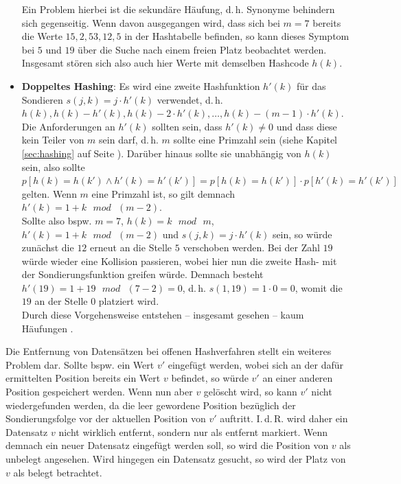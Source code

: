 \begin{itemize}
	Ein Problem hierbei ist die sekundäre Häufung, d.\,h. Synonyme behindern sich gegenseitig. Wenn davon ausgegangen wird, dass sich bei $m=7$ bereits die Werte $15, 2, 53, 12, 5$ in der Hashtabelle befinden, so kann dieses Symptom bei $5$ und $19$ über die Suche nach einem freien Platz beobachtet werden. Insgesamt stören sich also auch hier Werte mit demselben Hashcode $h(k)$.
	\item \textbf{Doppeltes Hashing}: Es wird eine zweite Hashfunktion $h'(k)$ für das Sondieren $s(j,k) = j \cdot h'(k)$ verwendet, d.\,h. $h(k), h(k)-h'(k), h(k)-2 \cdot h'(k), \dots, h(k)-(m-1)\cdot h'(k)$. Die Anforderungen an $h'(k)$ sollten sein, dass $h'(k) \neq 0$ und dass diese kein Teiler von $m$ sein darf, d.\,h. $m$ sollte eine Primzahl sein (siehe Kapitel \ref{sec:hashing} auf Seite \pageref{sec:hashing}). Darüber hinaus sollte sie unabhängig von $h(k)$ sein, also sollte $p[h(k) = h(k') \wedge h'(k) = h'(k')] = p[h(k) = h(k')] \cdot p[h'(k) = h'(k')]$ gelten. Wenn $m$ eine Primzahl ist, so gilt demnach $h'(k) = 1+k \text{ } mod \text{ } (m-2)$.\\
	Sollte also bspw. $m=7$, $h(k) = k \text{ } mod \text{ } m$, $h'(k) = 1 + k \text{ } mod \text{ } (m-2)$ und $s(j,k) = j \cdot h'(k)$ sein, so würde zunächst die $12$ erneut an die Stelle $5$ verschoben werden. Bei der Zahl $19$ würde wieder eine Kollision passieren, wobei hier nun die zweite Hash- mit der Sondierungsfunktion greifen würde. Demnach besteht $h'(19) = 1 + 19 \text{ } mod \text{ } (7-2) = 0$, d.\,h. $s(1,19) = 1 \cdot 0 = 0$, womit die $19$ an der Stelle $0$ platziert wird.\\
	Durch diese Vorgehensweise entstehen -- insgesamt gesehen -- kaum Häufungen \cite[S.282-285]{s1992}. 
\end{itemize}
Die Entfernung von Datensätzen bei offenen Hashverfahren stellt ein weiteres Problem dar. Sollte bspw. ein Wert $v'$ eingefügt werden, wobei sich an der dafür ermittelten Position bereits ein Wert $v$ befindet, so würde $v'$ an einer anderen Position gespeichert werden. Wenn nun aber $v$ gelöscht wird, so kann $v'$ nicht wiedergefunden werden, da die leer gewordene Position bezüglich der Sondierungsfolge vor der aktuellen Position von $v'$ auftritt. I.\,d.\,R. wird daher ein Datensatz $v$ nicht wirklich entfernt, sondern nur als entfernt markiert. Wenn demnach ein neuer Datensatz eingefügt werden soll, so wird die Position von $v$ als unbelegt angesehen. Wird hingegen ein Datensatz gesucht, so wird der Platz von $v$ als belegt betrachtet.\\
